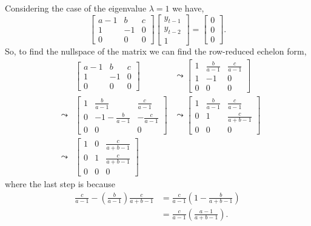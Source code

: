 \documentclass[../MathsNotesBase.tex]{subfiles}
\begin{document}
{		
		Considering the case of the eigenvalue ${ \lambda = 1 }$ we have,
		\[
			\begin{bmatrix}
				a-1 &  b & c \\
				1   & -1 & 0 \\
				0   &  0 & 0
			\end{bmatrix}
			\begin{bmatrix}y_{t-1}\\y_{t-2}\\1\end{bmatrix} =
			\begin{bmatrix}0\\0\\0\end{bmatrix}. 
	    \]
	    So, to find the nullspace of the matrix we can find the row-reduced echelon form,
	    \begin{align*}
	    && 	\begin{bmatrix}
		    	a-1 &  b & c \\
		    	1   & -1 & 0 \\
		    	0   &  0 & 0	
		    \end{bmatrix} &\leadsto
		    \begin{bmatrix}
			    1 &  \frac{b}{a-1} & \frac{c}{a-1} \\
			    1   & -1 & 0 \\
			    0   &  0 & 0	
		    \end{bmatrix} \\[4pt]
	    &\leadsto & 
		    \begin{bmatrix}
			    1 &  \frac{b}{a-1} & \frac{c}{a-1} \\
			    0  & -1-\frac{b}{a-1} & -\frac{c}{a-1} \\
			    0   &  0 & 0	
		    \end{bmatrix} &\leadsto 
		    \begin{bmatrix}
			    1 &  \frac{b}{a-1} & \frac{c}{a-1} \\
			    0   & 1 & \frac{c}{a+b-1} \\
			    0   &  0 & 0	
		    \end{bmatrix}  \\[4pt]
		&\leadsto &
			\begin{bmatrix}
				1 & 0 & \frac{c}{a+b-1} \\
				0 & 1 & \frac{c}{a+b-1} \\
				0 & 0 & 0	
			\end{bmatrix}
	    \end{align*}
	    where the last step is because
	  	\begin{align*}
	  	\frac{c}{a-1} - \left(\frac{b}{a-1}\right)\frac{c}{a+b-1} &= \frac{c}{a-1}\left(1 - \frac{b}{a+b-1}\right) \\
	  	&= \frac{c}{a-1}\left(\frac{a-1}{a+b-1}\right). \\
	  	\end{align*} 
	  	
}
\end{document}

